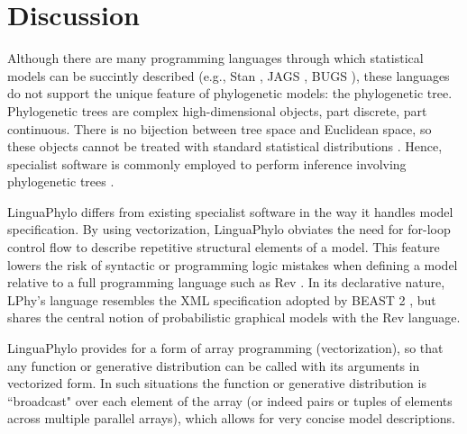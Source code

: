 \documentclass[10pt,letterpaper,table]{article}
\begin{document}



\section*{Discussion}
Although there are many
programming languages through which statistical 
models can be succintly described (e.g., Stan
\cite{carpenter2017stan}, JAGS \cite{plummer2003jags}, BUGS
\cite{lunn2009bugs, gilks1994language}), these languages do not
support the unique feature of phylogenetic models: the phylogenetic
tree.
Phylogenetic trees are complex high-dimensional objects, part
discrete, part continuous.
There is no bijection between tree space and Euclidean space, so these
objects cannot be treated with standard statistical distributions \cite{gavryushkin2016space}.
Hence, specialist software is commonly employed to perform inference
involving phylogenetic trees
\cite{hohna2016revbayes,bouckaert2019beastanalysis}.

LinguaPhylo differs from existing specialist software in the way it handles model specification.
By using vectorization, LinguaPhylo obviates the need for for-loop control flow to describe repetitive structural elements of a model.
This feature lowers the risk of syntactic or programming logic mistakes when defining a model relative to a full programming language such as Rev \cite{revbayes}.
In its declarative nature, LPhy's language resembles the XML specification adopted by BEAST 2 \cite{bouckaert2014beast}, but shares the central notion of probabilistic graphical models with the Rev language.

LinguaPhylo provides for a form of array programming (vectorization), so that any function or
generative distribution can be called with its arguments in
vectorized form. In such situations the function or generative distribution is ``broadcast" over each element of the array (or indeed pairs or tuples of elements across multiple parallel arrays), which allows for very concise model descriptions.

\end{document}
